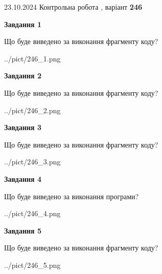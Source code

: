 \documentclass[12pt, ukrainian]{article}
\begin{document}
{\Large{23.10.2024 Контрольна робота , варіант  \No \textbf { 246 }\par}}
{
\begin {large}
{\begin {center}\textbf{Завдання 1}\end {center}}

Що буде виведено за виконання фрагменту коду?\par
\begin{center}
	{../pict/246_1.png}
\end{center}
\newpage

{\begin {center}\textbf{Завдання 2}\end {center}}

Що буде виведено за виконання фрагменту коду?\par
\begin{center}
	{../pict/246_2.png}
\end{center}
\newpage

{\begin {center}\textbf{Завдання 3}\end {center}}

Що буде виведено за виконання фрагменту коду?\par
\begin{center}
	{../pict/246_3.png}
\end{center}
\newpage

{\begin {center}\textbf{Завдання 4}\end {center}}

Що буде виведено за виконання програми?\par
\begin{center}
	{../pict/246_4.png}
\end{center}
\newpage

{\begin {center}\textbf{Завдання 5}\end {center}}

Що буде виведено за виконання фрагменту коду?\par
\begin{center}
	{../pict/246_5.png}
\end{center}
\newpage


\end{large}}
\end{document}
